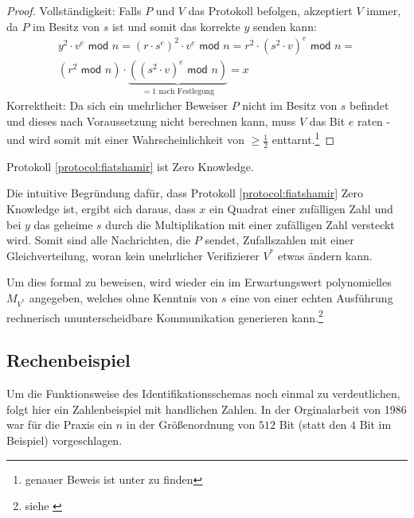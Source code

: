 \begin{proof}
Vollständigkeit: Falls \( P \) und \( V \) das Protokoll befolgen, akzeptiert \( V \) immer, da \( P \) im Besitz von \( s \) ist und somit das korrekte \( y \) senden kann:
\begin{multline*}
y^2 \cdot v^e \textsf{ mod } n =
\left( r \cdot s^e \right)^2 \cdot v^e \textsf{ mod } n =
r^2 \cdot \left( s^2 \cdot v \right)^e \textsf{ mod } n = \\
\left( r^2 \textsf{ mod } n \right) \cdot \underbrace{ \left( \left( s^2 \cdot v \right)^e \textsf{ mod } n \right) }_{ = 1 \text{ nach Festlegung}} = x
\end{multline*}
Korrektheit: Da sich ein unehrlicher Beweiser \( P \) nicht im Besitz von \( s \) befindet und dieses nach Voraussetzung nicht berechnen kann, muss \( V \) das Bit \( e \) raten - und wird somit mit einer Wahrscheinlichkeit von \( \geq \frac{1}{2} \) enttarnt.\footnote{genauer Beweis ist unter \cite[Lemma 1 + 2]{fiatshamir} zu finden}
\end{proof}

\vspace{0.2cm}

\begin{theorem}
Protokoll \ref{protocol:fiatshamir} ist Zero Knowledge.
\end{theorem}

Die intuitive Begründung dafür, dass Protokoll \ref{protocol:fiatshamir} Zero Knowledge ist, ergibt sich daraus, dass \( x \) ein Quadrat einer zufälligen Zahl und bei \( y \) das geheime \( s \) durch die Multiplikation mit einer zufälligen Zahl versteckt wird. Somit sind alle Nachrichten, die \( P \) sendet, Zufallszahlen mit einer Gleichverteilung, woran kein unehrlicher Verifizierer \( V^{\ast} \) etwas ändern kann.

Um dies formal zu beweisen, wird wieder ein im Erwartungswert polynomielles \( M_{V^{\ast}} \) angegeben, welches ohne Kenntnis von \( s \) eine von einer echten Ausführung rechnerisch ununterscheidbare Kommunikation generieren kann.\footnote{siehe \cite{fiatshamir}}


\subsection{Rechenbeispiel}
Um die Funktionsweise des Identifikationsschemas noch einmal zu verdeutlichen, folgt hier ein Zahlenbeispiel mit handlichen Zahlen. In der Orginalarbeit \cite{fiatshamir} von 1986 war für die Praxis ein \( n \) in der Größenordnung von \( 512 \) Bit (statt den \( 4 \) Bit im Beispiel) vorgeschlagen.


